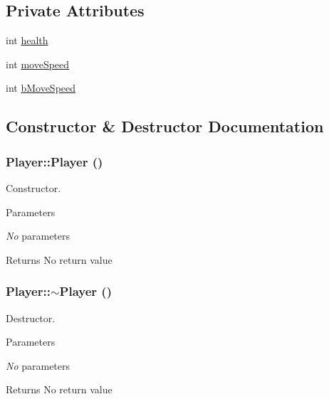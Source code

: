 \subsection*{Private Attributes}
\begin{DoxyCompactItemize}
\item 
int \hyperlink{classPlayer_aad33b52bfe73c4c978a3135172f286a0}{health}
\item 
int \hyperlink{classPlayer_a84469d0950bc9151404b8930e6cf0ebb}{moveSpeed}
\item 
int \hyperlink{classPlayer_a33023a67c031eceeef05268f01eae43d}{bMoveSpeed}
\end{DoxyCompactItemize}


\subsection{Constructor \& Destructor Documentation}
\hypertarget{classPlayer_affe0cc3cb714f6deb4e62f0c0d3f1fd8}{
\subsubsection[{Player}]{\setlength{\rightskip}{0pt plus 5cm}Player::Player ()}}
\label{classPlayer_affe0cc3cb714f6deb4e62f0c0d3f1fd8}


Constructor. 
\begin{DoxyParams}{Parameters}
\item[{\em No}]parameters \end{DoxyParams}
\begin{DoxyReturn}{Returns}
No return value 
\end{DoxyReturn}
\hypertarget{classPlayer_a749d2c00e1fe0f5c2746f7505a58c062}{
\subsubsection[{$\sim$Player}]{\setlength{\rightskip}{0pt plus 5cm}Player::$\sim$Player ()}}
\label{classPlayer_a749d2c00e1fe0f5c2746f7505a58c062}


Destructor. 
\begin{DoxyParams}{Parameters}
\item[{\em No}]parameters \end{DoxyParams}
\begin{DoxyReturn}{Returns}
No return value 
\end{DoxyReturn}


